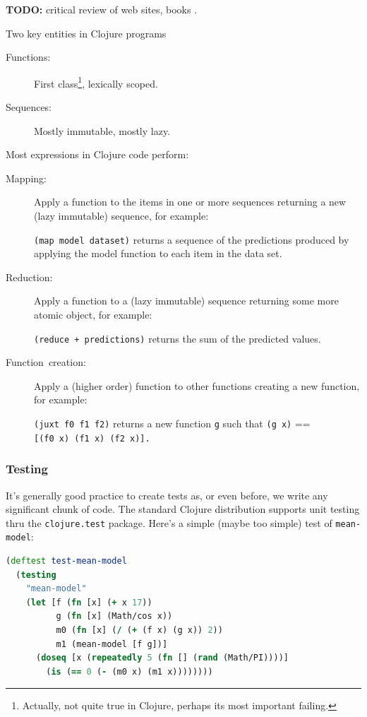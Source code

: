 \documentclass[11pt,openany,american,usenames,dvipsnames,svgnames,x11names,table,isodate]{article}
\numberwithin{equation}{section}
\numberwithin{figure}{section}
\begin{document}
\textbf{TODO: }critical review of web sites, books \cite{emerick2011clojure,fogus2011clojure,halloway2009clojure,rathore2011clojure}.

Two key entities in Clojure programs
\begin{description}
\item [{Functions:}] First class\footnote{Actually, not quite true in Clojure, perhaps its most important failing.},
lexically scoped.
\item [{Sequences:}] Mostly immutable, mostly lazy.
\end{description}
Most expressions in Clojure code perform:
\begin{description}
\item [{Mapping:}] Apply a function to the items in one or more sequences
returning a new (lazy immutable) sequence, for example:


\texttt{(map~model~dataset)} returns a sequence of the predictions
produced by applying the model function to each item in the data set.

\item [{Reduction:}] Apply a function to a (lazy immutable) sequence returning
some more atomic object, for example:


\texttt{(reduce~+~predictions)} returns the sum of the predicted
values.

\item [{Function~creation:}] Apply a (higher order) function to other
functions creating a new function, for example:


\texttt{(juxt~f0~f1~f2)} returns a new function \texttt{g} such
that \texttt{(g~x)} == \texttt{{[}(f0~x)~(f1~x)~(f2~x){]}.}

\end{description}

\subsubsection{Testing}

It's generally good practice to create tests as, or even before, we
write any significant chunk of code. The standard Clojure distribution
supports unit testing thru the \texttt{clojure.test} package. Here's
a simple (maybe too simple) test of \texttt{mean-model}:

\begin{lstlisting}[caption={Trivial unit test for \texttt{mean-model}},label={lis:test-mean-model},language=clojure,tabsize=2]
(deftest test-mean-model
  (testing
    "mean-model"
    (let [f (fn [x] (+ x 17)) 
          g (fn [x] (Math/cos x))
          m0 (fn [x] (/ (+ (f x) (g x)) 2))
          m1 (mean-model [f g])]
      (doseq [x (repeatedly 5 (fn [] (rand (Math/PI))))]
        (is (== 0 (- (m0 x) (m1 x))))))))
\end{lstlisting}
\end{document}
